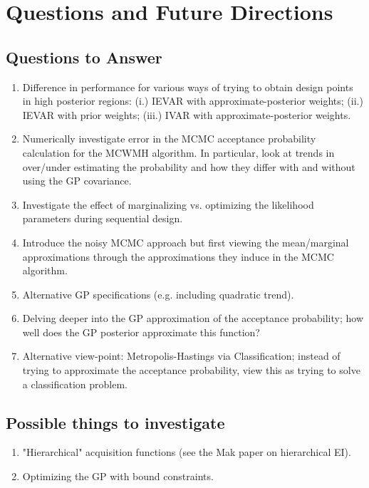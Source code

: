 \documentclass[12pt]{article}
\begin{document}
\section{Questions and Future Directions}

\subsection{Questions to Answer}
\begin{enumerate} 
\item Difference in performance for various ways of trying to obtain design points in high posterior regions: (i.) IEVAR with approximate-posterior 
weights; (ii.) IEVAR with prior weights; (iii.) IVAR with approximate-posterior weights. 
\item Numerically investigate error in the MCMC acceptance probability calculation for the MCWMH algorithm. In particular, look at trends in over/under 
estimating the probability and how they differ with and without using the GP covariance. 
\item Investigate the effect of marginalizing vs. optimizing the likelihood parameters during sequential design. 
\item Introduce the noisy MCMC approach but first viewing the mean/marginal approximations through the approximations they induce in the MCMC algorithm. 
\item Alternative GP specifications (e.g. including quadratic trend). 
\item Delving deeper into the GP approximation of the acceptance probability; how well does the GP posterior approximate this function? 
\item Alternative view-point: Metropolis-Hastings via Classification; instead of trying to approximate the acceptance probability, view this as trying to solve a classification problem. 
\end{enumerate}

\subsection{Possible things to investigate}
\begin{enumerate}
\item "Hierarchical" acquisition functions (see the Mak paper on hierarchical EI). 
\item Optimizing the GP with bound constraints. 
\end{enumerate}
\end{document}
